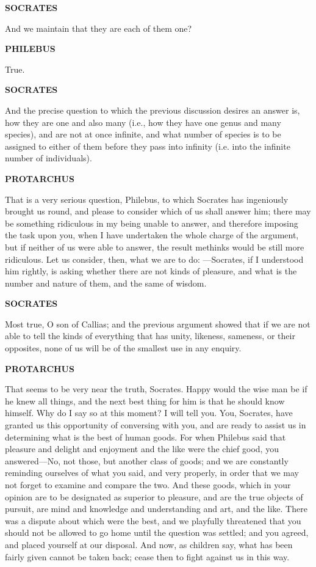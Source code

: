 \documentclass[11pt,letter]{article}
\begin{document}
\par \textbf{SOCRATES}
\par   And we maintain that they are each of them one?

\par \textbf{PHILEBUS}
\par   True.

\par \textbf{SOCRATES}
\par   And the precise question to which the previous discussion desires an answer is, how they are one and also many (i.e., how they have one genus and many species), and are not at once infinite, and what number of species is to be assigned to either of them before they pass into infinity (i.e. into the infinite number of individuals).

\par \textbf{PROTARCHUS}
\par   That is a very serious question, Philebus, to which Socrates has ingeniously brought us round, and please to consider which of us shall answer him; there may be something ridiculous in my being unable to answer, and therefore imposing the task upon you, when I have undertaken the whole charge of the argument, but if neither of us were able to answer, the result methinks would be still more ridiculous. Let us consider, then, what we are to do: —Socrates, if I understood him rightly, is asking whether there are not kinds of pleasure, and what is the number and nature of them, and the same of wisdom.

\par \textbf{SOCRATES}
\par   Most true, O son of Callias; and the previous argument showed that if we are not able to tell the kinds of everything that has unity, likeness, sameness, or their opposites, none of us will be of the smallest use in any enquiry.

\par \textbf{PROTARCHUS}
\par   That seems to be very near the truth, Socrates. Happy would the wise man be if he knew all things, and the next best thing for him is that he should know himself. Why do I say so at this moment? I will tell you. You, Socrates, have granted us this opportunity of conversing with you, and are ready to assist us in determining what is the best of human goods. For when Philebus said that pleasure and delight and enjoyment and the like were the chief good, you answered—No, not those, but another class of goods; and we are constantly reminding ourselves of what you said, and very properly, in order that we may not forget to examine and compare the two. And these goods, which in your opinion are to be designated as superior to pleasure, and are the true objects of pursuit, are mind and knowledge and understanding and art, and the like. There was a dispute about which were the best, and we playfully threatened that you should not be allowed to go home until the question was settled; and you agreed, and placed yourself at our disposal. And now, as children say, what has been fairly given cannot be taken back; cease then to fight against us in this way.
\end{document}
